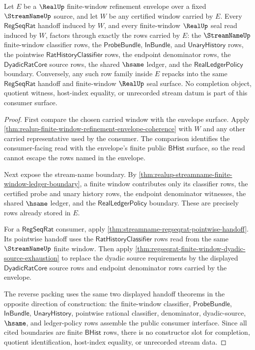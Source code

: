 \begin{theorem}
\label{thm:realup-finite-window-refinement-envelope-consumer-coverage}
Let $E$ be a $\RealUp$ finite-window refinement envelope over a fixed
$\StreamNameUp$ source, and let $W$ be any certified window carried by $E$.
Every $\mathsf{RegSeqRat}$ handoff induced by $W$, and every finite-window
$\RealUp$ seal read induced by $W$, factors through exactly the rows carried
by $E$: the $\StreamNameUp$ finite-window classifier rows, the
$\mathsf{ProbeBundle}$, $\mathsf{InBundle}$, and $\mathsf{UnaryHistory}$ rows,
the pointwise $\mathsf{RatHistoryClassifier}$ rows, the endpoint denominator
rows, the $\mathsf{DyadicRatCore}$ source rows, the shared $\hsame$ ledger,
and the $\mathsf{RealLedgerPolicy}$ boundary. Conversely, any such row family
inside $E$ repacks into the same $\mathsf{RegSeqRat}$ handoff and
finite-window $\RealUp$ seal surface. No completion object, quotient witness,
host-index equality, or unrecorded stream datum is part of this consumer
surface.
\end{theorem}
\begin{proof}
First compare the chosen carried window with the envelope surface. Apply
\autoref{thm:realup-finite-window-refinement-envelope-coherence} with $W$ and
any other carried representative used by the consumer. The comparison
identifies the consumer-facing read with the envelope's finite public
$\mathsf{BHist}$ surface, so the read cannot escape the rows named in the
envelope.

Next expose the stream-name boundary. By
\autoref{thm:realup-streamname-finite-window-ledger-boundary}, a finite
window contributes only its classifier rows, the certified probe and unary
history rows, the endpoint denominator witnesses, the shared $\hsame$ ledger,
and the $\mathsf{RealLedgerPolicy}$ boundary. These are precisely rows already
stored in $E$.

For a $\mathsf{RegSeqRat}$ consumer, apply
\autoref{thm:streamname-regseqrat-pointwise-handoff}. Its pointwise handoff
uses the $\mathsf{RatHistoryClassifier}$ rows read from the same
$\StreamNameUp$ finite window. Then apply
\autoref{thm:regseqrat-finite-window-dyadic-source-exhaustion} to replace the
dyadic source requirements by the displayed $\mathsf{DyadicRatCore}$ source
rows and endpoint denominator rows carried by the envelope.

The reverse packing uses the same two displayed handoff theorems in the
opposite direction of construction: the finite-window classifier,
$\mathsf{ProbeBundle}$, $\mathsf{InBundle}$, $\mathsf{UnaryHistory}$,
pointwise rational classifier, denominator, dyadic-source, $\hsame$, and
ledger-policy rows assemble the public consumer interface. Since all cited
boundaries are finite $\mathsf{BHist}$ rows, there is no constructor slot for
completion, quotient identification, host-index equality, or unrecorded
stream data.
\end{proof}


